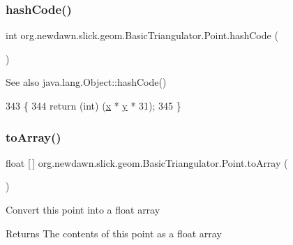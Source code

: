 \subsubsection{\texorpdfstring{hash\+Code()}{hashCode()}}
{\footnotesize\ttfamily int org.\+newdawn.\+slick.\+geom.\+Basic\+Triangulator.\+Point.\+hash\+Code (\begin{DoxyParamCaption}{ }\end{DoxyParamCaption})\hspace{0.3cm}{\ttfamily [inline]}}

\begin{DoxySeeAlso}{See also}
java.\+lang.\+Object\+::hash\+Code() 
\end{DoxySeeAlso}

\begin{DoxyCode}
343                               \{
344             \textcolor{keywordflow}{return} (\textcolor{keywordtype}{int}) (\mbox{\hyperlink{classorg_1_1newdawn_1_1slick_1_1geom_1_1_basic_triangulator_1_1_point_a430d2074970ce9d8248e998f45e0deac}{x}} * \mbox{\hyperlink{classorg_1_1newdawn_1_1slick_1_1geom_1_1_basic_triangulator_1_1_point_aad601993c7f613bd1e26c48a62a950d7}{y}} * 31);
345         \}
\end{DoxyCode}
\mbox{\label{classorg_1_1newdawn_1_1slick_1_1geom_1_1_basic_triangulator_1_1_point_acb4b7fb3bab66540d7cad1c662415c56}} 
\subsubsection{\texorpdfstring{to\+Array()}{toArray()}}
{\footnotesize\ttfamily float \mbox{[}$\,$\mbox{]} org.\+newdawn.\+slick.\+geom.\+Basic\+Triangulator.\+Point.\+to\+Array (\begin{DoxyParamCaption}{ }\end{DoxyParamCaption})\hspace{0.3cm}{\ttfamily [inline]}}

Convert this point into a float array

\begin{DoxyReturn}{Returns}
The contents of this point as a float array 
\end{DoxyReturn}

